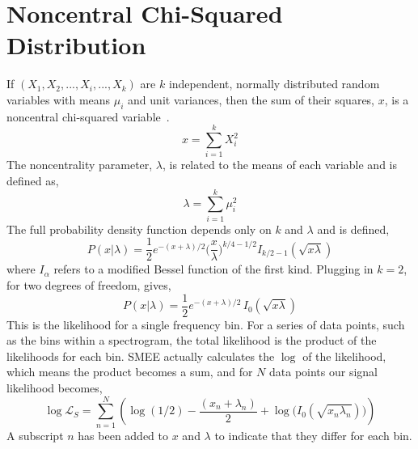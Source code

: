 \section{Noncentral Chi-Squared Distribution}

If $(X_{1}, X_{2}, ... , X_{i}, ... , X_{k})$ are $k$ independent, normally distributed random variables with means $\mu_{i}$ and unit variances, then the sum of their squares, $x$, is a noncentral chi-squared variable~\cite{freedman2007statistics}.
\begin{equation}
    x = \sum_{i=1}^{k} X_{i}^{2}
\end{equation}
The noncentrality parameter, $\lambda$, is related to the means of each variable and is defined as,
\begin{equation}
    \lambda = \sum_{i=1}^{k} \mu_{i}^{2}
\end{equation}
The full probability density function depends only on $k$ and $\lambda$ and is defined,
\begin{equation}
\label{equ:chi_pdf}
    P(x|\lambda) = \frac{1}{2}e^{-(x + \lambda) / 2}\Big(\frac{x}{\lambda}\Big)^{k/4-1/2} I_{k/2-1}(\sqrt{x\lambda})
\end{equation}
where $I_{\alpha}$ refers to a modified Bessel function of the first kind. Plugging in $k = 2$, for two degrees of freedom, gives,
\begin{equation}
    P(x|\lambda) = \frac{1}{2}e^{-(x + \lambda) / 2}\,I_{0}(\sqrt{x\lambda})
\end{equation}
This is the likelihood for a single frequency bin. For a series of data points, such as the bins within a spectrogram, the total likelihood is the product of the likelihoods for each bin. SMEE actually calculates the $\log$ of the likelihood, which means the product becomes a sum, and for $N$ data points our signal likelihood becomes,
\begin{equation}
\label{equ:signal_like_N_def}
    \log \mathcal{L}_{S} = \sum_{n=1}^{N} \left( \log(1/2) - \frac{(x_{n} + \lambda_{n})}{2} + \log\Big(I_0(\sqrt{x_{n}\lambda_{n}})\Big) \right)
\end{equation}
A subscript $n$ has been added to $x$ and $\lambda$ to indicate that they differ for each bin.

